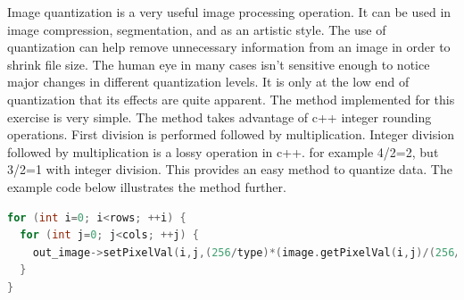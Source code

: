 \documentclass[letterpaper,10pt]{article}
\begin{document}
Image quantization is a very useful image processing operation. It can be used in image compression, segmentation, and as an artistic style. The use of quantization can help remove unnecessary information from an image in order to shrink file size. The human eye in many cases isn't sensitive enough to notice major changes in different quantization levels. It is only at the low end of quantization that its effects are quite apparent. The method implemented for this exercise is very simple. The method takes advantage of c++ integer rounding operations. First division is performed followed by multiplication. Integer division followed by multiplication is a lossy operation in c++. for example 4/2=2, but 3/2=1 with integer division. This provides an easy method to quantize data. The example code below illustrates the method further.
\begin{lstlisting}[frame=single, language=c++]
for (int i=0; i<rows; ++i) {
  for (int j=0; j<cols; ++j) {
    out_image->setPixelVal(i,j,(256/type)*(image.getPixelVal(i,j)/(256/type)));
  }
}
\end{lstlisting}
\end{document}
